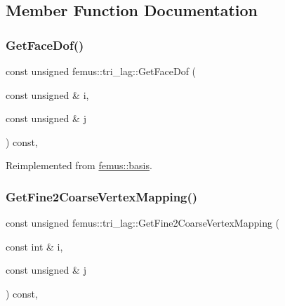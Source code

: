\subsection{Member Function Documentation}
\mbox{\label{classfemus_1_1tri__lag_a1f53bf1823d6a1f1e593dc25df0fecc1}} 
\subsubsection{\texorpdfstring{Get\+Face\+Dof()}{GetFaceDof()}}
{\footnotesize\ttfamily const unsigned femus\+::tri\+\_\+lag\+::\+Get\+Face\+Dof (\begin{DoxyParamCaption}\item[{const unsigned \&}]{i,  }\item[{const unsigned \&}]{j }\end{DoxyParamCaption}) const\hspace{0.3cm}{\ttfamily [inline]}, {\ttfamily [virtual]}}



Reimplemented from \mbox{\hyperlink{classfemus_1_1basis_a06f93864b6ce0925d41bf08173dc2500}{femus\+::basis}}.

\mbox{\label{classfemus_1_1tri__lag_a884d403e16a7d3bb459809ef8e07a74c}} 
\subsubsection{\texorpdfstring{Get\+Fine2\+Coarse\+Vertex\+Mapping()}{GetFine2CoarseVertexMapping()}}
{\footnotesize\ttfamily const unsigned femus\+::tri\+\_\+lag\+::\+Get\+Fine2\+Coarse\+Vertex\+Mapping (\begin{DoxyParamCaption}\item[{const int \&}]{i,  }\item[{const unsigned \&}]{j }\end{DoxyParamCaption}) const\hspace{0.3cm}{\ttfamily [inline]}, {\ttfamily [virtual]}}



